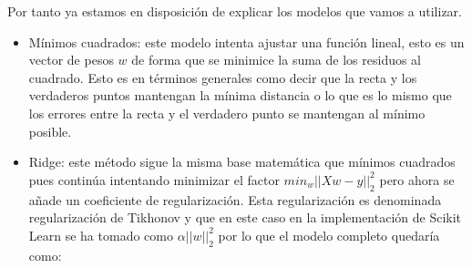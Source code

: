 \documentclass[12pt,a4paper]{article}
\begin{document}
Por tanto ya estamos en disposición de explicar los modelos que vamos a utilizar. 

\begin{itemize}
	\item Mínimos cuadrados: este modelo intenta ajustar una función lineal, esto es un vector de pesos $w$ de forma que se minimice la suma de los residuos al cuadrado. Esto es en términos generales como decir que la recta y los verdaderos puntos mantengan la mínima distancia o lo que es lo mismo que los errores entre la recta y el verdadero punto se mantengan al mínimo posible.
	\item Ridge: este método sigue la misma base matemática que mínimos cuadrados pues continúa intentando minimizar el factor $min_w || Xw-y ||_2^2$ pero ahora se añade un coeficiente de regularización. Esta regularización es denominada regularización de Tikhonov y que en este caso en la implementación de Scikit Learn se ha tomado como $\alpha ||w||_2^2$ por lo que el modelo completo quedaría como:
	

\end{itemize}
\end{document}
